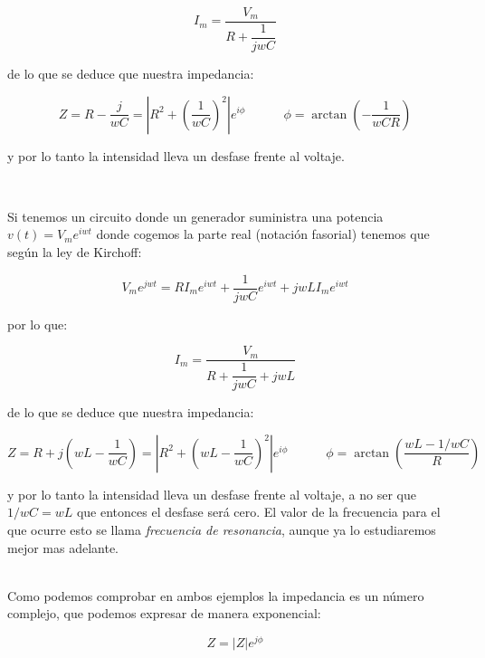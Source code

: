 \documentclass[12pt]{article}
\newcommand{\parentesis}[1]{\left( #1  \right)}
\newcommand{\tquad}{\quad \quad \quad}
\begin{document}
\begin{equation}
I_m = \dfrac{V_m}{R +  \dfrac{1}{jwC}}
\end{equation}

de lo que se deduce que nuestra impedancia:

\begin{equation}
Z = R - \dfrac{j}{wC} = \left| R^2 +  \parentesis{\dfrac{1}{wC}}^2 \right| e^{i \phi} \tquad \phi = \arctan(-\dfrac{1}{wCR})
\end{equation}

y por lo tanto la intensidad lleva un desfase frente al voltaje.

\hrulefill \\


\hrulefill 

Si tenemos un circuito donde un generador suministra una potencia $v(t) = V_m e^{iwt}$ donde cogemos la parte real (notación fasorial) tenemos que según la ley de Kirchoff:

\begin{equation}
V_m e^{jwt} = R I_m e^{iwt} + \dfrac{1}{jwC} e^{iwt}  + jwLI_m e^{iwt}  
\end{equation}

por lo que:

\begin{equation}
I_m = \dfrac{V_m}{R +  \dfrac{1}{jwC} + jwL}
\end{equation}

de lo que se deduce que nuestra impedancia:

\begin{equation}
Z = R + j\parentesis{wL - \dfrac{1}{wC}}= \left| R^2 +  \parentesis{wL -\dfrac{1}{wC}}^2 \right| e^{i \phi} \tquad \phi = \arctan(\dfrac{wL  - 1/wC}{R})
\end{equation}

y por lo tanto la intensidad lleva un desfase frente al voltaje, a no ser que $1/wC = wL$ que entonces el desfase será cero. El valor de la frecuencia para el que ocurre esto se llama \textit{frecuencia de resonancia}, aunque ya lo estudiaremos mejor mas adelante.

\hrulefill \\


Como podemos comprobar en ambos ejemplos la impedancia es un número complejo, que podemos expresar de manera exponencial:

\begin{equation}
Z = |Z| e^{j\phi}
\end{equation}
\end{document}
